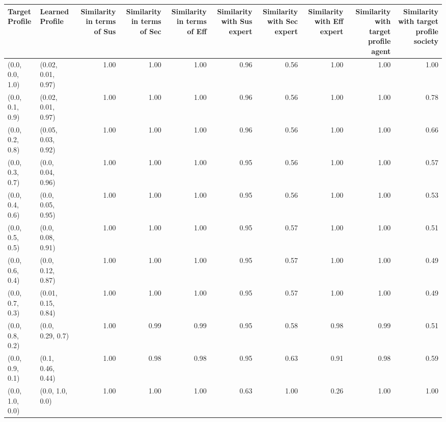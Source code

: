 \begin{tabular}{llrrrrrrrr}
\toprule
Target Profile & Learned Profile & Similarity in terms of Sus & Similarity in terms of Sec & Similarity in terms of Eff & Similarity with Sus expert & Similarity with Sec expert & Similarity with Eff expert & Similarity with target profile agent & Similarity with target profile society \\
\midrule
(0.0, 0.0, 1.0) & (0.02, 0.01, 0.97) & 1.00 & 1.00 & 1.00 & 0.96 & 0.56 & 1.00 & 1.00 & 1.00 \\
(0.0, 0.1, 0.9) & (0.02, 0.01, 0.97) & 1.00 & 1.00 & 1.00 & 0.96 & 0.56 & 1.00 & 1.00 & 0.78 \\
(0.0, 0.2, 0.8) & (0.05, 0.03, 0.92) & 1.00 & 1.00 & 1.00 & 0.96 & 0.56 & 1.00 & 1.00 & 0.66 \\
(0.0, 0.3, 0.7) & (0.0, 0.04, 0.96) & 1.00 & 1.00 & 1.00 & 0.95 & 0.56 & 1.00 & 1.00 & 0.57 \\
(0.0, 0.4, 0.6) & (0.0, 0.05, 0.95) & 1.00 & 1.00 & 1.00 & 0.95 & 0.56 & 1.00 & 1.00 & 0.53 \\
(0.0, 0.5, 0.5) & (0.0, 0.08, 0.91) & 1.00 & 1.00 & 1.00 & 0.95 & 0.57 & 1.00 & 1.00 & 0.51 \\
(0.0, 0.6, 0.4) & (0.0, 0.12, 0.87) & 1.00 & 1.00 & 1.00 & 0.95 & 0.57 & 1.00 & 1.00 & 0.49 \\
(0.0, 0.7, 0.3) & (0.01, 0.15, 0.84) & 1.00 & 1.00 & 1.00 & 0.95 & 0.57 & 1.00 & 1.00 & 0.49 \\
(0.0, 0.8, 0.2) & (0.0, 0.29, 0.7) & 1.00 & 0.99 & 0.99 & 0.95 & 0.58 & 0.98 & 0.99 & 0.51 \\
(0.0, 0.9, 0.1) & (0.1, 0.46, 0.44) & 1.00 & 0.98 & 0.98 & 0.95 & 0.63 & 0.91 & 0.98 & 0.59 \\
(0.0, 1.0, 0.0) & (0.0, 1.0, 0.0) & 1.00 & 1.00 & 1.00 & 0.63 & 1.00 & 0.26 & 1.00 & 1.00 \\
\bottomrule
\end{tabular}
